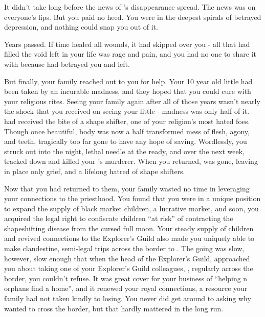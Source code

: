 \documentclass[char]{NeptuneBall}
\begin{document}
It didn't take long before the news of \cAriel{}'s disappearance spread. The news was on everyone's lips. But you paid no heed. You were in the deepest spirals of betrayed depression, and nothing could snap you out of it.

Years passed. If time healed all wounds, it had skipped over you - all that had filled the void left in your life was rage and pain, and you had no one to share it with because \emph{\cAriel{\they}} had betrayed you and left.

But finally, your family reached out to you for help. Your 10 year old little \cSister{\sibling} \cSister{} had been taken by an incurable madness, and they hoped that you could cure \cSister{\them} with your religious rites. Seeing your family again after all of those years wasn't nearly the shock that you received on seeing your little \cSister{\sibling} - madness was only half of it. \cSister{\They} had received the bite of a shape shifter, one of your religion's most hated foes. Though \cSister{\they} \cSister{\were} once beautiful, \cSister{\their} body was now a half transformed mess of flesh, agony, and teeth, tragically too far gone to have any hope of saving. Wordlessly, you struck out into the night, lethal needle at the ready, and over the next week, tracked down and killed your \cSister{\sibling}'s murderer. When you returned, \cSister{} was gone, leaving in \cSister{\their} place only grief, and a lifelong hatred of shape shifters.

Now that you had returned to them, your family wasted no time in leveraging your connections to the priesthood. You found that you were in a unique position to expand the supply of black market children, a lucrative market, and soon, you acquired the legal right to confiscate children ``at risk'' of contracting the shapeshifting disease from the cursed full moon. Your steady supply of children and revived connections to the Explorer's Guild also made you uniquely able to make clandestine, semi-legal trips across the border to \pPacifica{}. The going was slow, however, slow enough that when the head of the Explorer's Guild, \cPlant{\Prince} \cPlant{} \cPlant{\themself} approached you about taking one of your Explorer's Guild colleagues, \cPlant{\their} \cPrincess{\nephew}, \cPrincess{\Prince} \cPrincess{} regularly across the border, you couldn't refuse. It was great cover for your business of ``helping \pAtlantis{}n orphans find a home'', and it renewed your royal connections, a resource your family had not taken kindly to losing. You never did get around to asking why \cPrincess{\they} wanted to cross the border, but that hardly mattered in the long run.
\end{document}

